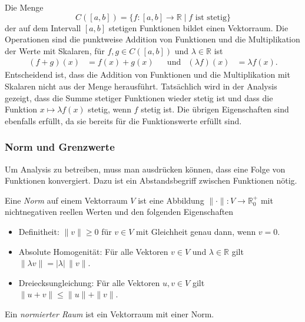 \begin{beispiel}
Die Menge
\[
C([a,b])
=
\{f\colon[a,b]\to\mathbb{R}\mid \text{$f$ ist stetig}\}
\]
der auf dem Intervall $[a,b]$ stetigen Funktionen bildet einen Vektorraum.
Die Operationen sind die punktweise Addition von Funktionen und die
Multiplikation der Werte mit Skalaren, für $f,g\in C([a,b])$ und
$\lambda\in \mathbb{R}$ ist
\begin{align*}
(f+g)(x) &= f(x)+g(x)
&&\text{und}&
(\lambda f)(x) &= \lambda f(x).
\end{align*}
Entscheidend ist, dass die Addition von Funktionen und die Multiplikation
mit Skalaren nicht aus der Menge herausführt.
Tatsächlich wird in der Analysis gezeigt, dass die Summe stetiger Funktionen
wieder stetig ist und dass die Funktion $x\mapsto \lambda f(x)$ stetig,
wenn $f$ stetig ist.
Die übrigen Eigenschaften sind ebenfalls erfüllt, da sie bereits für die
Funktionswerte erfüllt sind.
\end{beispiel}

%
%
\subsubsection{Norm und Grenzwerte}
Um Analysis zu betreiben, muss man ausdrücken können, dass eine Folge
von Funktionen konvergiert.
Dazu ist ein Abstandsbegriff zwischen Funktionen nötig.

\begin{definition}
Eine {\em Norm} auf einem Vektorraum $V$ ist eine Abbildung
%
$\|\cdot\|\colon V\to\mathbb{R}^+_0$ mit nichtnegativen reellen Werten
und den folgenden Eigenschaften
\begin{itemize}
\item Definitheit: $\|v\|\ge 0$ für $v\in V$ mit Gleichheit 
genau dann, wenn $v=0$.
%
\item Absolute Homogenität: Für alle Vektoren $v\in V$ und
%
$\lambda\in\mathbb{R}$ gilt $\|\lambda v\| = |\lambda|\, \|v\|$.
\item Dreiecksungleichung: Für alle Vektoren $u,v\in V$ gilt
%
$\|u+v\|\le \|u\|+\|v\|$.
\end{itemize}
Ein {\em normierter Raum} ist ein Vektorraum mit einer Norm.
%
\end{definition}

